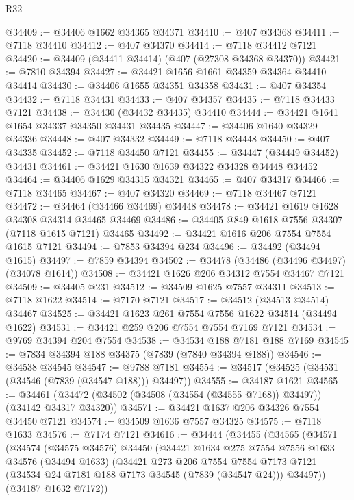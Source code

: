 \begin{lexlean}{R32}
\begin{coremodule}
@34409 := @34406 @1662 @34365 @34371
@34410 := @407 @34368
@34411 := @7118 @34410
@34412 := @407 @34370
@34414 := @7118 @34412 @7121
@34420 := @34409 (@34411 @34414) (@407 (@27308 @34368 @34370))
@34421 := @7810 @34394
@34427 := @34421 @1656 @1661 @34359 @34364 @34410 @34414
@34430 := @34406 @1655 @34351 @34358
@34431 := @407 @34354
@34432 := @7118 @34431
@34433 := @407 @34357
@34435 := @7118 @34433 @7121
@34438 := @34430 (@34432 @34435) @34410
@34444 := @34421 @1641 @1654 @34337 @34350 @34431 @34435
@34447 := @34406 @1640 @34329 @34336
@34448 := @407 @34332
@34449 := @7118 @34448
@34450 := @407 @34335
@34452 := @7118 @34450 @7121
@34455 := @34447 (@34449 @34452) @34431
@34461 := @34421 @1630 @1639 @34322 @34328 @34448 @34452
@34464 := @34406 @1629 @34315 @34321
@34465 := @407 @34317
@34466 := @7118 @34465
@34467 := @407 @34320
@34469 := @7118 @34467 @7121
@34472 := @34464 (@34466 @34469) @34448
@34478 := @34421 @1619 @1628 @34308 @34314 @34465 @34469
@34486 := @34405 @849 @1618 @7556 @34307 (@7118 @1615 @7121) @34465
@34492 := @34421 @1616 @206 @7554 @7554 @1615 @7121
@34494 := @7853 @34394 @234
@34496 := @34492 (@34494 @1615)
@34497 := @7859 @34394
@34502 := @34478 (@34486 (@34496 @34497) (@34078 @1614))
@34508 := @34421 @1626 @206 @34312 @7554 @34467 @7121
@34509 := @34405 @231
@34512 := @34509 @1625 @7557 @34311
@34513 := @7118 @1622
@34514 := @7170 @7121
@34517 := @34512 (@34513 @34514) @34467
@34525 := @34421 @1623 @261 @7554 @7556 @1622 @34514 (@34494 @1622)
@34531 := @34421 @259 @206 @7554 @7554 @7169 @7121
@34534 := @9769 @34394 @204 @7554
@34538 := @34534 @188 @7181 @188 @7169
@34545 := @7834 @34394 @188 @34375 (@7839 (@7840 @34394 @188))
@34546 := @34538 @34545
@34547 := @9788 @7181
@34554 := @34517 (@34525 (@34531 (@34546 (@7839 (@34547 @188))) @34497))
@34555 := @34187 @1621
@34565 := @34461 (@34472 (@34502 (@34508 (@34554 (@34555 @7168)) @34497)) (@34142 @34317 @34320))
@34571 := @34421 @1637 @206 @34326 @7554 @34450 @7121
@34574 := @34509 @1636 @7557 @34325
@34575 := @7118 @1633
@34576 := @7174 @7121
@34616 := @34444
    (@34455
      (@34565
        (@34571
          (@34574
            (@34575 @34576)
            @34450
            (@34421
              @1634
              @275
              @7554
              @7556
              @1633
              @34576
              (@34494 @1633)
              (@34421
                @273
                @206
                @7554
                @7554
                @7173
                @7121
                (@34534 @24 @7181 @188 @7173 @34545 (@7839 (@34547 @24)))
                @34497))
            (@34187 @1632 @7172))

\end{coremodule}
\end{lexlean}

